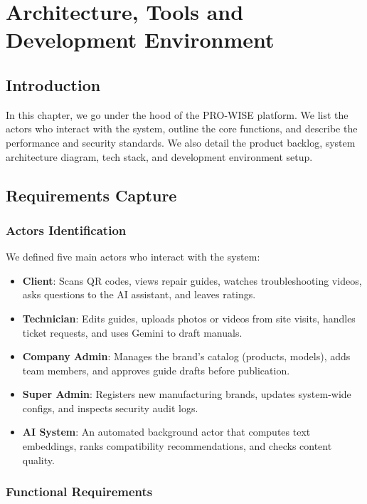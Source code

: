 \documentclass[12pt,a4paper]{report}
\begin{document}
\chapter{Architecture, Tools and Development Environment}

\section{Introduction}

In this chapter, we go under the hood of the PRO-WISE platform. We list the actors who interact with the system, outline the core functions, and describe the performance and security standards. We also detail the product backlog, system architecture diagram, tech stack, and development environment setup.

\section{Requirements Capture}

\subsection{Actors Identification}

We defined five main actors who interact with the system:

\begin{itemize}
    \item \textbf{Client}: Scans QR codes, views repair guides, watches troubleshooting videos, asks questions to the AI assistant, and leaves ratings.
    \item \textbf{Technician}: Edits guides, uploads photos or videos from site visits, handles ticket requests, and uses Gemini to draft manuals.
    \item \textbf{Company Admin}: Manages the brand's catalog (products, models), adds team members, and approves guide drafts before publication.
    \item \textbf{Super Admin}: Registers new manufacturing brands, updates system-wide configs, and inspects security audit logs.
    \item \textbf{AI System}: An automated background actor that computes text embeddings, ranks compatibility recommendations, and checks content quality.
\end{itemize}

\subsection{Functional Requirements}
\end{document}
